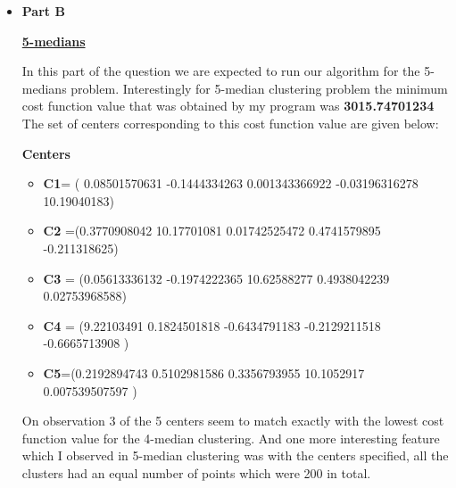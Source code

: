\documentclass[11pt]{article}
\begin{document}
\begin{itemize}
\begin{itemize}
	\end{itemize}
	
	
\item[] \textbf{Part B}

\underline{\textbf{5-medians}}

In this part of the question we are expected to run our algorithm for the 5-medians problem. Interestingly for 5-median clustering problem the minimum cost function value that was obtained by my program was \textbf{3015.74701234}\\

The set of centers corresponding to this cost function value are given below:

	\textbf{ Centers}
	\begin{itemize}
		\item \textbf{C1}= ( 0.08501570631	-0.1444334263	0.001343366922	-0.03196316278	10.19040183) 
		\item \textbf{C2} =(0.3770908042	10.17701081	0.01742525472	0.4741579895	-0.211318625)
		\item \textbf{C3} = (0.05613336132	-0.1974222365	10.62588277	0.4938042239	0.02753968588)
		\item \textbf{C4} = (9.22103491	0.1824501818	-0.6434791183	-0.2129211518	-0.6665713908
		)
		\item \textbf{C5}=(0.2192894743	0.5102981586	0.3356793955	10.1052917	0.007539507597
		)
	\end{itemize}
	
On observation 3 of the 5 centers seem to match exactly with the lowest cost function value for the 4-median clustering. And one more interesting feature which I observed in 5-median clustering was with the centers specified, all the clusters had an equal number of points which were 200 in total.	
 
\end{itemize}
\end{document}
